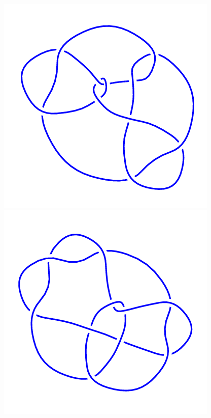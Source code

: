 \begin{figure}[H]
\begin{minipage}[b]{.18\linewidth}
	\end{minipage}
	\begin{minipage}[b]{.18\linewidth}
		\centering
		\includegraphics[width=\linewidth]{../data/10_154.png}
	\end{minipage}
	\begin{minipage}[b]{.18\linewidth}
		\centering
		\includegraphics[width=\linewidth]{../data/10_155.png}

\end{minipage}
\end{figure}
